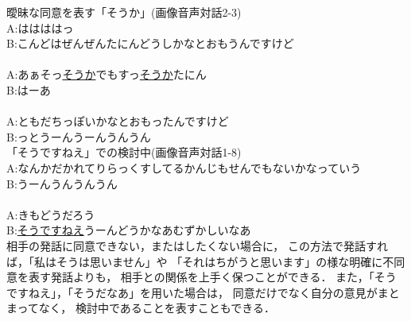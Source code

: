 \hspace*{-0.5cm}{\bf 対話１１}\hspace{0.33cm}曖昧な同意を表す「そうか」(画像音声対話2-3)\\
A:\hspace{2.7cm}はは\hspace{4.05cm}ははっ\\
B:こんどはぜんぜんたにんどうしかなとおもうんですけど\\
\vspace{-0.3cm}\\
A:あぁそっ\hspace{0.66cm}\underline{そうか}\hspace{0.17cm}でもすっ\hspace{0.17cm}\underline{そうか}\hspace{0.17cm}たにん\\
B:\hspace{1.82cm}はーあ\\
\vspace{-0.3cm}\\
A:\hspace{1.83cm}ともだちっぽいかなとおもったんですけど\\
B:っとうーん\hspace{4.53cm}うーんうんうん\\

\hspace*{-0.5cm}{\bf 対話１２}\hspace{0.33cm}「そうですねえ」での検討中(画像音声対話1-8)\\
A:なんか\hspace{0.33cm}だかれてりらっくすしてるかんじもせん\hspace{0.17cm}でもないかなっ\hspace{0.17cm}ていう\\
B:\hspace{7.23cm}うーん\hspace{1.0cm}うんうんうん\\
\vspace{-0.3cm}\\
A:きも\hspace{4.66cm}どうだろう\\
B:\hspace{0.66cm}\underline{そうですねえ}\hspace{1.0cm}うーん\hspace{1.33cm}どうかなあむずかしいなあ\\

相手の発話に同意できない，またはしたくない場合に，
この方法で発話すれば，「私はそうは思いません」や
「それはちがうと思います」の様な明確に不同意を表す発話よりも，
相手との関係を上手く保つことができる．
また，「そうですねえ」，「そうだなあ」を用いた場合は，
同意だけでなく自分の意見がまとまってなく，
検討中であることを表すこともできる．


